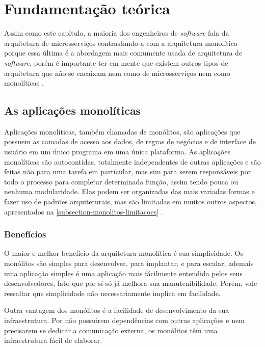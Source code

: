 \chapter{Fundamentação teórica}\label{chapter-fundamentacao}


Assim como este capítulo, a maioria dos engenheiros de \emph{software} fala da arquitetura de microsserviços contrastando-a com a arquitetura monolítica porque essa última é a abordagem mais comumente usada de arquitetura de \emph{software}, porém é importante ter em mente que existem outros tipos de arquitetura que não se encaixam nem como de microsserviços nem como monolíticas \cite{martin-fowler-microservice-tradeoffs}.

\section{As aplicações monolíticas}\label{sessao-monolitos}

Aplicações monolíticas, também chamadas de monólitos, são aplicações que possuem as camadas de acesso aos dados, de regras de negócios e de interface de usuário em um único programa em uma única plataforma. As aplicações monolíticas são autocontidas, totalmente independentes de outras aplicações e são feitas não para uma tarefa em particular, mas sim para serem responsáveis por todo o processo para completar determinada função, assim tendo pouca ou nenhuma modularidade. Elas podem ser organizadas das mais variadas formas e fazer uso de padrões arquiteturais, mas são limitadas em muitos outros aspectos, apresentados na \autoref{subsection-monolitos-limitacoes} \cite{wiki_monolithic_2022}.

\subsection{Benefícios}

O maior e melhor benefício da arquitetura monolítica é sua simplicidade. Os monólitos são simples para desenvolver, para implantar, e para escalar, ademais uma aplicação simples é uma aplicação mais fácilmente entendida pelos seus desenvolvedores, fato que por sí só já melhora sua manutenibilidade. Porém, vale ressaltar que simplicidade não necessariamente implica em facilidade.

Outra vantagem dos monólitos é a facilidade de desenvolvimento da sua infraestrutura. Por não possuirem dependências com outras aplicações e nem precisarem se dedicar a comunicação externa, os monólitos têm uma infraestrutura fácil de elaborar.

